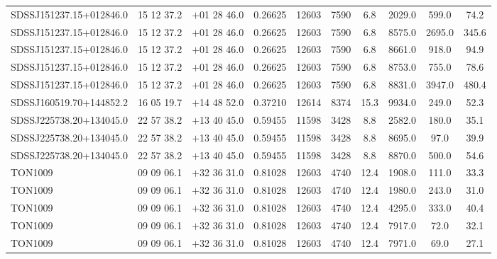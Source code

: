 \begin{landscape}
\begin{center}
\begin{longtable}{l c c c c c c c c c}
SDSSJ151237.15+012846.0  & 15 12 37.2  &         $+$01 28 46.0  &       0.26625  & 12603  &   7590  &       6.8  &       2029.0  &  599.0  &  74.2  \\
SDSSJ151237.15+012846.0  & 15 12 37.2  &         $+$01 28 46.0  &       0.26625  & 12603  &   7590  &       6.8  &       8575.0  &  2695.0  & 345.6  \\
SDSSJ151237.15+012846.0  & 15 12 37.2  &         $+$01 28 46.0  &       0.26625  & 12603  &   7590  &       6.8  &       8661.0  &  918.0  &  94.9  \\
SDSSJ151237.15+012846.0  & 15 12 37.2  &         $+$01 28 46.0  &       0.26625  & 12603  &   7590  &       6.8  &       8753.0  &  755.0  &  78.6  \\
SDSSJ151237.15+012846.0  & 15 12 37.2  &         $+$01 28 46.0  &       0.26625  & 12603  &   7590  &       6.8  &       8831.0  &  3947.0  & 480.4  \\
SDSSJ160519.70+144852.2  & 16 05 19.7  &         $+$14 48 52.0  &       0.37210  & 12614  &   8374  &       15.3  &      9934.0  &  249.0  &  52.3  \\
SDSSJ225738.20+134045.0  & 22 57 38.2  &         $+$13 40 45.0  &       0.59455  & 11598  &   3428  &       8.8  &       2582.0  &  180.0  &  35.1  \\
SDSSJ225738.20+134045.0  & 22 57 38.2  &         $+$13 40 45.0  &       0.59455  & 11598  &   3428  &       8.8  &       8695.0  &  97.0  &   39.9  \\
SDSSJ225738.20+134045.0  & 22 57 38.2  &         $+$13 40 45.0  &       0.59455  & 11598  &   3428  &       8.8  &       8870.0  &  500.0  &  54.6  \\
TON1009  &                 09 09 06.1  &         $+$32 36 31.0  &       0.81028  & 12603  &   4740  &       12.4  &      1908.0  &  111.0  &  33.3  \\
TON1009  &                 09 09 06.1  &         $+$32 36 31.0  &       0.81028  & 12603  &   4740  &       12.4  &      1980.0  &  243.0  &  31.0  \\
TON1009  &                 09 09 06.1  &         $+$32 36 31.0  &       0.81028  & 12603  &   4740  &       12.4  &      4295.0  &  333.0  &  40.4  \\
TON1009  &                 09 09 06.1  &         $+$32 36 31.0  &       0.81028  & 12603  &   4740  &       12.4  &      7917.0  &  72.0  &   32.1  \\
TON1009  &                 09 09 06.1  &         $+$32 36 31.0  &       0.81028  & 12603  &   4740  &       12.4  &      7971.0  &  69.0  &   27.1  \\

\end{longtable}
\end{center}
\end{landscape}
